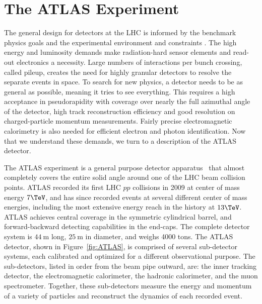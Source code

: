 \section{The ATLAS Experiment}
\label{sec:ATLAS}
The general design for detectors at the LHC is informed by the benchmark physics goals and the experimental environment and constraints \cite{tdr}.  The high energy and luminosity demands make radiation-hard sensor elements and read-out electronics a necessity.  Large numbers of interactions per bunch crossing, called pileup, creates the need for highly granular detectors to resolve the separate events in space.  To search for new physics, a detector needs to be as general as possible, meaning it tries to see everything.  This requires a high acceptance in pseudorapidity with coverage over nearly the full azimuthal angle of the detector, high track reconstruction efficiency and good resolution on charged-particle momentum measurements.  Fairly precise electromagnetic calorimetry is also needed for efficient electron and photon identification.  Now that we understand these demands, we turn to a description of the ATLAS detector. 

The ATLAS experiment is a general purpose detector apparatus~\cite{Aad:2008zzm} that almost completely covers the entire solid angle around one of the LHC beam collision points.  ATLAS recorded its first LHC $pp$ collisions in 2009 at center of mass energy $7\TeV$, and has since recorded events at several different center of mass energies, including the most extensive energy reach in the history at $13\TeV$.  %
ATLAS achieves central coverage in the symmetric cylindrical barrel, and forward-backward detecting capabilities in the end-caps.  The complete detector system is $44~\mathrm{m}$ long, $25~\mathrm{m}$ in diameter, and weighs 4000 tons.  The ATLAS detector, shown in Figure~\ref{fig:ATLAS}, is comprised of several sub-detector systems, each calibrated and optimized for a different observational purpose.  The sub-detectors, listed in order from the beam pipe outward, are: the inner tracking detector, the electromagnetic calorimeter, the hadronic calorimeter, and the muon spectrometer.  Together, these sub-detectors measure the energy and momentum of a variety of particles and reconstruct the dynamics of each recorded event.  

